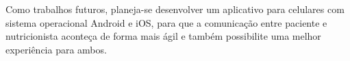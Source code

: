 \documentclass[
	12pt,				%
    oneside,			%
	a4paper,			%
	english,			%
	french,				%
	spanish,			%
	brazil,				%
	]{abntex2}
\begin{document}
Como trabalhos futuros, planeja-se desenvolver um aplicativo para celulares com sistema operacional Android e iOS,
para que a comunicação entre paciente e nutricionista aconteça de forma mais ágil e também possibilite uma melhor
experiência para ambos.

\postextual



%
%






\end{document}
